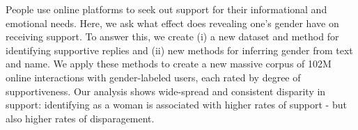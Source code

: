 People use online platforms to seek out support for their informational and emotional needs. Here, we ask what effect does revealing one's gender have on receiving support. To answer this, we create (i) a new dataset and method for identifying supportive replies and (ii) new methods for inferring gender from text and name. We apply these methods to create a new massive corpus of 102M online interactions with gender-labeled users, each rated by degree of supportiveness.  Our analysis shows wide-spread and consistent disparity in support: identifying as a woman is associated with higher rates of support - but also higher rates of disparagement.
